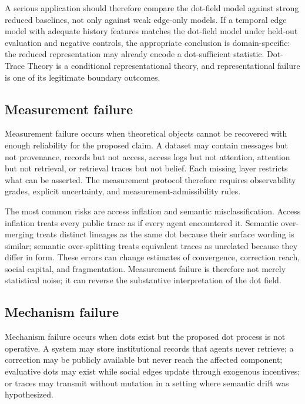 \documentclass[11pt]{article}
\theoremstyle{remark}
\begin{document}
A serious application should therefore compare the dot-field model against strong reduced baselines, not only against weak edge-only models. If a temporal edge model with adequate history features matches the dot-field model under held-out evaluation and negative controls, the appropriate conclusion is domain-specific: the reduced representation may already encode a dot-sufficient statistic. Dot-Trace Theory is a conditional representational theory, and representational failure is one of its legitimate boundary outcomes.

\subsection{Measurement failure}\label{measurement-failure}

Measurement failure occurs when theoretical objects cannot be recovered with enough reliability for the proposed claim. A dataset may contain messages but not provenance, records but not access, access logs but not attention, attention but not retrieval, or retrieval traces but not belief. Each missing layer restricts what can be asserted. The measurement protocol therefore requires observability grades, explicit uncertainty, and measurement-admissibility rules.

The most common risks are access inflation and semantic misclassification. Access inflation treats every public trace as if every agent encountered it. Semantic over-merging treats distinct lineages as the same dot because their surface wording is similar; semantic over-splitting treats equivalent traces as unrelated because they differ in form. These errors can change estimates of convergence, correction reach, social capital, and fragmentation. Measurement failure is therefore not merely statistical noise; it can reverse the substantive interpretation of the dot field.

\subsection{Mechanism failure}\label{mechanism-failure}

Mechanism failure occurs when dots exist but the proposed dot process is not operative. A system may store institutional records that agents never retrieve; a correction may be publicly available but never reach the affected component; evaluative dots may exist while social edges update through exogenous incentives; or traces may transmit without mutation in a setting where semantic drift was hypothesized.
\end{document}
